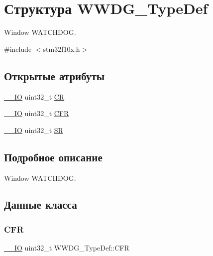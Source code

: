 \hypertarget{struct_w_w_d_g___type_def}{}\section{Структура W\+W\+D\+G\+\_\+\+Type\+Def}
\label{struct_w_w_d_g___type_def}


Window W\+A\+T\+C\+H\+D\+OG.  




{\ttfamily \#include $<$stm32f10x.\+h$>$}

\subsection*{Открытые атрибуты}
\begin{DoxyCompactItemize}
\item 
\mbox{\hyperlink{group___c_m_s_i_s___c_m3__core__definitions_gaec43007d9998a0a0e01faede4133d6be}{\+\_\+\+\_\+\+IO}} uint32\+\_\+t \mbox{\hyperlink{struct_w_w_d_g___type_def_a4caf530d45f7428c9700d9c0057135f8}{CR}}
\item 
\mbox{\hyperlink{group___c_m_s_i_s___c_m3__core__definitions_gaec43007d9998a0a0e01faede4133d6be}{\+\_\+\+\_\+\+IO}} uint32\+\_\+t \mbox{\hyperlink{struct_w_w_d_g___type_def_adcd6a7e5d75022e46ce60291f4b8544c}{C\+FR}}
\item 
\mbox{\hyperlink{group___c_m_s_i_s___c_m3__core__definitions_gaec43007d9998a0a0e01faede4133d6be}{\+\_\+\+\_\+\+IO}} uint32\+\_\+t \mbox{\hyperlink{struct_w_w_d_g___type_def_a15655cda4854cc794db1f27b3c0bba38}{SR}}
\end{DoxyCompactItemize}


\subsection{Подробное описание}
Window W\+A\+T\+C\+H\+D\+OG. 

\subsection{Данные класса}
\mbox{\label{struct_w_w_d_g___type_def_adcd6a7e5d75022e46ce60291f4b8544c}} 
\subsubsection{\texorpdfstring{CFR}{CFR}}
{\footnotesize\ttfamily \mbox{\hyperlink{group___c_m_s_i_s___c_m3__core__definitions_gaec43007d9998a0a0e01faede4133d6be}{\+\_\+\+\_\+\+IO}} uint32\+\_\+t W\+W\+D\+G\+\_\+\+Type\+Def\+::\+C\+FR}

